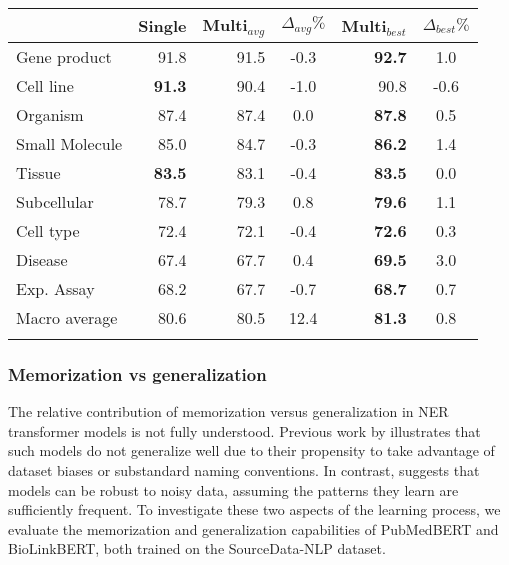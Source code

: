\documentclass{bioinfo}
\begin{document}
\begin{table}[!h]
 {\begin{tabular}{@{}lrrc|rc@{}}\toprule
               & Single         & Multi$_{avg}$        & $\Delta_{avg}\% $ & Multi$_{best}$ & $\Delta_{best}\%$\\\midrule
Gene product   & 91.8           & 91.5              & -0.3     &  \textbf{92.7}  & 1.0\\
Cell line      & \textbf{91.3}  & 90.4              & -1.0     &  90.8           & -0.6\\
Organism       & 87.4           & 87.4              & 0.0      &  \textbf{87.8}  & 0.5\\
Small Molecule & 85.0           & 84.7              & -0.3     &  \textbf{86.2}  & 1.4\\
Tissue         & \textbf{83.5}  & 83.1              & -0.4     &  \textbf{83.5}  & 0.0\\
Subcellular    & 78.7           & 79.3              & 0.8      &  \textbf{79.6}  & 1.1\\
Cell type      & 72.4           & 72.1              & -0.4     &  \textbf{72.6}  & 0.3\\
Disease        & 67.4           & 67.7              & 0.4      &  \textbf{69.5}  & 3.0\\
Exp. Assay     & 68.2           & 67.7              & -0.7     &  \textbf{68.7}  & 0.7\\\hline
Macro average  & 80.6           & 80.5              & 12.4     &  \textbf{81.3}  & 0.8\\ \botrule
\end{tabular}}{}
\end{table}

\subsubsection{Memorization vs generalization}\label{sec:memo-vs-gen}

The relative contribution of memorization versus generalization in NER transformer models is not fully understood. Previous work by \cite{Kim2021HowDY-memory} illustrates that such models do not generalize well due to their propensity to take advantage of dataset biases or substandard naming conventions. In contrast, \cite{Tnzer2021MemorisationVG}  suggests that models can be robust to noisy data, assuming the patterns they learn are sufficiently frequent. To investigate these two aspects of the learning process, we evaluate the memorization and generalization capabilities of PubMedBERT and BioLinkBERT, both trained on the SourceData-NLP dataset.
\end{document}
